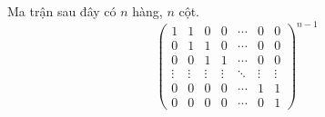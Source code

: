 \documentclass[class=nhvh-linear-algebra,crop=false]{standalone}
\begin{document}
\begin{exercise}
    Ma trận sau đây có $n$ hàng, $n$ cột.
    \[
        \begin{pmatrix}
            1      & 1      & 0      & 0      & \cdots & 0      & 0      \\
            0      & 1      & 1      & 0      & \cdots & 0      & 0      \\
            0      & 0      & 1      & 1      & \cdots & 0      & 0      \\
            \vdots & \vdots & \vdots & \vdots & \ddots & \vdots & \vdots \\
            0      & 0      & 0      & 0      & \cdots & 1      & 1      \\
            0      & 0      & 0      & 0      & \cdots & 0      & 1
        \end{pmatrix}^{n-1}
    \]
\end{exercise}
\end{document}
